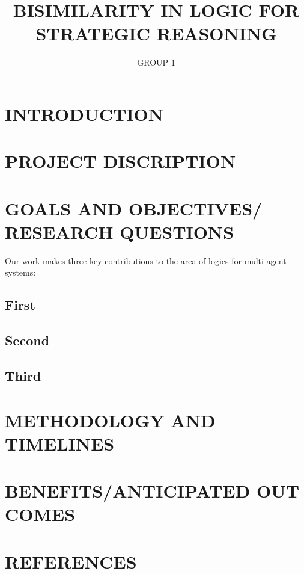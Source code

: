 \documentclass[10pt,a4paper]{article}
\begin{document}
\author{GROUP 1}
\title{\textbf{BISIMILARITY IN LOGIC FOR STRATEGIC REASONING}}
\maketitle
\section{INTRODUCTION}

	
\section{PROJECT DISCRIPTION}	

\section{GOALS AND OBJECTIVES/ RESEARCH QUESTIONS}	
	Our work makes three key contributions to the area of logics for multi-agent systems:
	\subsection{First}
 
\subsection{Second}

\subsection{Third}

\section{METHODOLOGY AND TIMELINES}

\section{BENEFITS/ANTICIPATED OUT COMES}
\section{REFERENCES}


	
	
\end{document}
